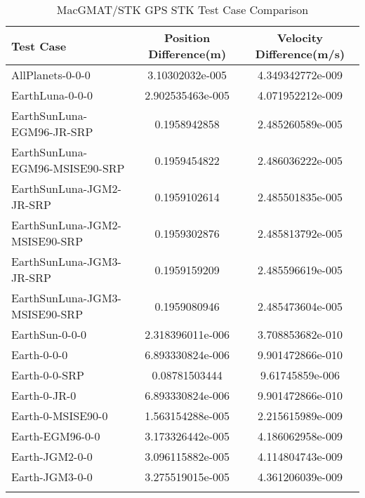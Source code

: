\begin{table}[htbp!]
\centering
\caption{ MacGMAT/STK GPS STK Test Case Comparison}
      \begin{tabular}{lcc}
      \hline\hline
          Test Case & Position Difference(m) & Velocity Difference(m/s) \\
         \hline
         AllPlanets-0-0-0 & 3.10302032e-005 & 4.349342772e-009 \\
         EarthLuna-0-0-0 & 2.902535463e-005 & 4.071952212e-009 \\
         EarthSunLuna-EGM96-JR-SRP & 0.1958942858 & 2.485260589e-005 \\
         EarthSunLuna-EGM96-MSISE90-SRP & 0.1959454822 & 2.486036222e-005 \\
         EarthSunLuna-JGM2-JR-SRP & 0.1959102614 & 2.485501835e-005 \\
         EarthSunLuna-JGM2-MSISE90-SRP & 0.1959302876 & 2.485813792e-005 \\
         EarthSunLuna-JGM3-JR-SRP & 0.1959159209 & 2.485596619e-005 \\
         EarthSunLuna-JGM3-MSISE90-SRP & 0.1959080946 & 2.485473604e-005 \\
         EarthSun-0-0-0 & 2.318396011e-006 & 3.708853682e-010 \\
         Earth-0-0-0 & 6.893330824e-006 & 9.901472866e-010 \\
         Earth-0-0-SRP & 0.08781503444 & 9.61745859e-006 \\
         Earth-0-JR-0 & 6.893330824e-006 & 9.901472866e-010 \\
         Earth-0-MSISE90-0 & 1.563154288e-005 & 2.215615989e-009 \\
         Earth-EGM96-0-0 & 3.173326442e-005 & 4.186062958e-009 \\
         Earth-JGM2-0-0 & 3.096115882e-005 & 4.114804743e-009 \\
         Earth-JGM3-0-0 & 3.275519015e-005 & 4.361206039e-009 \\
      \hline\hline
      \label{Table: GPS STK Table} 
\end{tabular}
\end{table}
